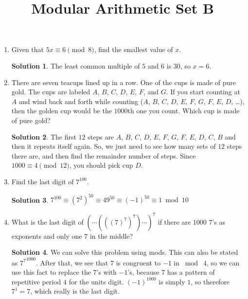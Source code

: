 \documentclass{article}
\title{Modular Arithmetic Set B}
\date{}
\author{}
\theoremstyle{definition}
\newtheorem*{solution}{Solution}
\begin{document}
\maketitle
\begin{multicols}{2}
    \raggedcolumns
    \begin{enumerate}
        \item Given that $5x \equiv 6 \pmod{8}$, find the smallest value of $x$.
            \begin{solution}
                The least common multiple of $5$ and $6$ is $30$, so $x = 6$.
            \end{solution}
        \item There are seven teacups lined up in a row.
            One of the cups is made of pure gold.
            The cups are labeled $A$, $B$, $C$, $D$, $E$, $F$, and $G$.
            If you start counting at $A$ and wind back and forth while counting ($A$, $B$, $C$, $D$, $E$, $F$, $G$, $F$, $E$, $D$, \dots), then the golden cup would be the $1000$th one you count.
            Which cup is made of pure gold?
            \begin{solution}
                The first $12$ steps are $A$, $B$, $C$, $D$, $E$, $F$, $G$, $F$, $E$, $D$, $C$, $B$ and then it repeats itself again.
                So, we just need to see how many sets of $12$ steps there are, and then find the remainder number of steps.
                Since $1000 \equiv 4 \pmod{12}$, you should pick cup $D$.
            \end{solution}
        \item Find the last digit of $7^{100}$.
            \begin{solution}
                $7^{100} \equiv (7^2)^{50} \equiv 49^{50} \equiv (-1)^{50} \equiv 1 \bmod 10$
            \end{solution}
        \item What is the last digit of $(\cdots(((7)^7)^7)\cdots)^7$ if there are $1000$ $7$'s as exponents and only one $7$ in the middle?
            \begin{solution}
                We can solve this problem using mods.
                This can also be stated as ${7^7}^{1000}$.
                After that, we see that $7$ is congruent to $-1$ in $\bmod \; 4$, so we can use this fact to replace the $7$'s with $-1$'s, because $7$ has a pattern of repetitive period $4$ for the units digit.
                $(-1)^{1000}$ is simply $1$, so therefore $7^1 = 7$, which really is the last digit.
            \end{solution}

\end{enumerate}
\end{multicols}
\end{document}
